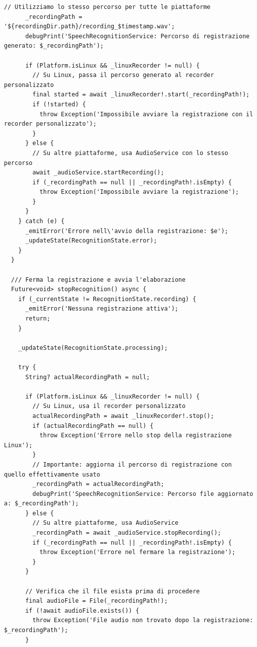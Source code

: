 \documentclass[14pt]{extbook}
\begin{document}
\begin{lstlisting}[caption=speech\_recognition\_service.dart, label=lst:SpeechRecognitionService]
      // Utilizziamo lo stesso percorso per tutte le piattaforme
      _recordingPath = '${recordingDir.path}/recording_$timestamp.wav';
      debugPrint('SpeechRecognitionService: Percorso di registrazione generato: $_recordingPath');

      if (Platform.isLinux && _linuxRecorder != null) {
        // Su Linux, passa il percorso generato al recorder personalizzato
        final started = await _linuxRecorder!.start(_recordingPath!);
        if (!started) {
          throw Exception('Impossibile avviare la registrazione con il recorder personalizzato');
        }
      } else {
        // Su altre piattaforme, usa AudioService con lo stesso percorso
        await _audioService.startRecording();
        if (_recordingPath == null || _recordingPath!.isEmpty) {
          throw Exception('Impossibile avviare la registrazione');
        }
      }
    } catch (e) {
      _emitError('Errore nell\'avvio della registrazione: $e');
      _updateState(RecognitionState.error);
    }
  }

  /// Ferma la registrazione e avvia l'elaborazione
  Future<void> stopRecognition() async {
    if (_currentState != RecognitionState.recording) {
      _emitError('Nessuna registrazione attiva');
      return;
    }

    _updateState(RecognitionState.processing);

    try {
      String? actualRecordingPath = null;

      if (Platform.isLinux && _linuxRecorder != null) {
        // Su Linux, usa il recorder personalizzato
        actualRecordingPath = await _linuxRecorder!.stop();
        if (actualRecordingPath == null) {
          throw Exception('Errore nello stop della registrazione Linux');
        }
        // Importante: aggiorna il percorso di registrazione con quello effettivamente usato
        _recordingPath = actualRecordingPath;
        debugPrint('SpeechRecognitionService: Percorso file aggiornato a: $_recordingPath');
      } else {
        // Su altre piattaforme, usa AudioService
        _recordingPath = await _audioService.stopRecording();
        if (_recordingPath == null || _recordingPath!.isEmpty) {
          throw Exception('Errore nel fermare la registrazione');
        }
      }

      // Verifica che il file esista prima di procedere
      final audioFile = File(_recordingPath!);
      if (!await audioFile.exists()) {
        throw Exception('File audio non trovato dopo la registrazione: $_recordingPath');
      }


\end{lstlisting}
\end{document}

